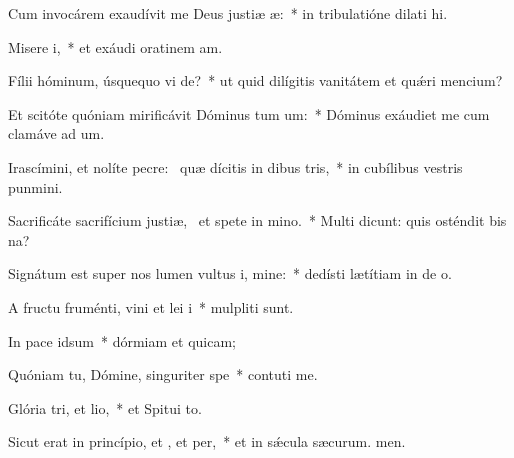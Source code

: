 \item Cum invocárem exaudívit me Deus justiæ æ:~* in tribulatióne dilati hi.
\item Misere i,~* et exáudi oratinem am.
\item Fílii hóminum, úsquequo vi de?~* ut quid dilígitis vanitátem et quǽri mencium?
\item Et scitóte quóniam mirificávit Dóminus tum um:~* Dóminus exáudiet me cum clamáve ad um.
\item Irascímini, et nolíte pecre:~\pscross{} quæ dícitis in dibus tris,~* in cubílibus vestris punmini.
\item Sacrificáte sacrifícium justiæ,~\pscross{} et spete in mino.~* Multi dicunt: quis osténdit bis na?
\item Signátum est super nos lumen vultus i, mine:~* dedísti lætítiam in de o.
\item A fructu fruménti, vini et lei i~* mulpliti sunt.
\item In pace  idsum~* dórmiam et quicam;
\item Quóniam tu, Dómine, singuriter  spe~* contuti me.
\item Glória tri, et lio,~* et Spitui to.
\item Sicut erat in princípio, et , et per,~* et in sǽcula sæcurum. men.
